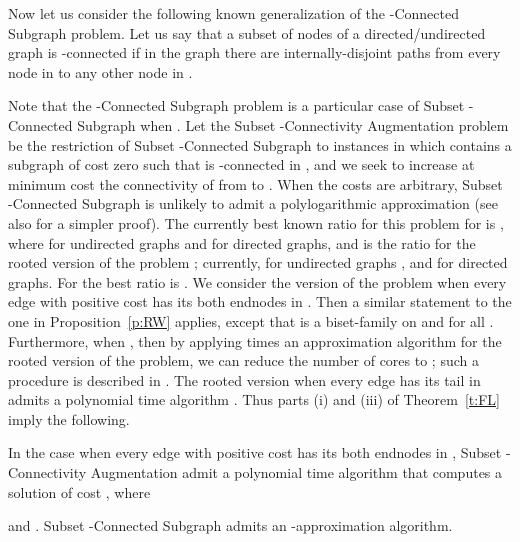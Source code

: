 Now let us consider the following known generalization of the {\sf -Connected Subgraph} problem.
Let us say that a subset  of nodes of a directed/undirected graph is -connected if in the graph 
there are  internally-disjoint paths from every node in  to any other node in .

\vspace{0.1cm}

\begin{center} 
\end{center}

\vspace{0.1cm}

Note that the {\sf -Connected Subgraph} problem is a particular case of 
{\sf Subset -Connected Subgraph} when .
Let the {\sf Subset -Connectivity Augmentation} problem be the restriction of 
{\sf Subset -Connected Subgraph} to instances in which  contains a 
subgraph  of cost zero such that  is -connected in ,
and we seek to increase at minimum cost
the connectivity of  from  to . 
When the costs are arbitrary, {\sf Subset -Connected Subgraph} is unlikely to admit 
a polylogarithmic approximation \cite{KKL} (see also \cite{LN} for a simpler proof).
The currently best known ratio for this problem for  is
,
where  for undirected graphs and  for directed graphs, and
 is the ratio for the rooted version of the problem \cite{L-subs,N-subs}; 
currently,  for undirected graphs \cite{N-focs}, and 
 for directed graphs. For  the best ratio is .
We consider the version of the problem when every edge with positive cost has its both endnodes
in . Then a similar statement to the one in Proposition~\ref{p:RW} applies, 
except that  is a biset-family on  and  for all .
Furthermore, when , then by applying  times an approximation algorithm for
the rooted version of the problem, we can reduce the number of cores to ;
such a procedure is described in \cite{L-subs,N-subs}.
The rooted version when every edge has its tail in  admits a polynomial time algorithm \cite{F-R}.
Thus parts (i) and (iii) of Theorem~\ref{t:FL} imply the following.

\begin{corollary} \label{t:aug'}
In the case when every edge with positive cost has its both endnodes in ,
{\sf Subset -Connectivity Augmentation} admit a polynomial time algorithm that computes a solution 
of cost , where 

and .
{\sf Subset -Connected Subgraph} admits an -approximation algorithm.
\end{corollary}

